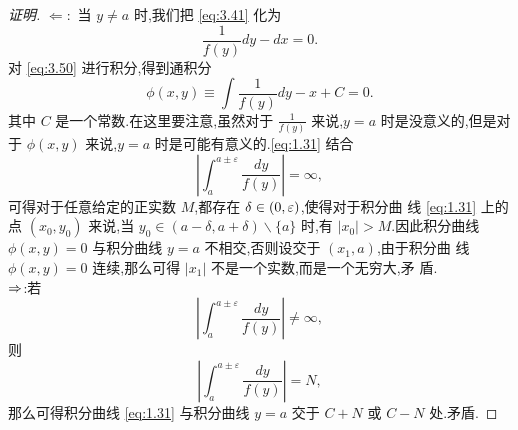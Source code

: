 \documentclass[a4paper, 12pt]{article} %
\begin{document}
\begin{proof}[证明]
$\Leftarrow:$  当 $y\neq a$ 时,我们把 \eqref{eq:3.41} 化为
  \begin{equation}
    \label{eq:3.50}
    \frac{1}{f(y)}dy-dx=0.
  \end{equation}
  对 \eqref{eq:3.50} 进行积分,得到通积分
  \begin{equation}\label{eq:1.31}
\phi(x,y)\equiv\int \frac{1}{f(y)}dy-x+C=0.
  \end{equation}
其中 $C$ 是一个常数.在这里要注意,虽然对于 $\frac{1}{f(y)}$ 来说,$y=a$ 时是没意义的,但是对
于 $\phi(x,y)$ 来说,$y=a$ 时是可能有意义的.\eqref{eq:1.31} 结合
$$
|\int_a^{a\pm \varepsilon}\frac{dy}{f(y)}|=\infty,
$$
可得对于任意给定的正实数 $M$,都存在 $\delta\in (0,\varepsilon)$,使得对于积分曲
线 \eqref{eq:1.31} 上的点 $(x_0,y_0)$ 来说,当 $y_0\in
(a-\delta,a+\delta)\backslash\{a\}$ 时,有 $|x_0|>M$.因此积分曲线
$\phi(x,y)=0$ 与积分曲线 $y=a$ 不相交,否则设交于 $(x_1,a)$,由于积分曲
线 $\phi(x,y)=0$ 连续,那么可得 $|x_1|$ 不是一个实数,而是一个无穷大,矛
盾.\\


\ni$\Rightarrow$:若$$
|\int_a^{a\pm \varepsilon}\frac{dy}{f(y)}|\neq\infty,
$$
则$$
|\int_a^{a\pm \varepsilon}\frac{dy}{f(y)}|=N,
$$
那么可得积分曲线 \eqref{eq:1.31} 与积分曲线 $y=a$ 交于 $C+N$ 或 $C-N$
处.矛盾.\end{proof}
\end{document}
